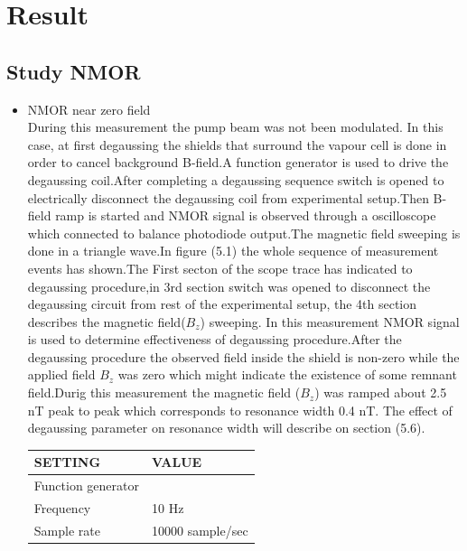 \chapter{Result\label{ch:results}}


\section{Study NMOR }
   \begin{itemize}
     \item NMOR near zero field \\
 During this measurement the pump beam was not been modulated. In this case,  at first degaussing the shields that surround the vapour cell is done in order to cancel background B-field.A function generator is used to drive the degaussing coil.After completing a degaussing sequence switch is opened to electrically disconnect the degaussing coil from experimental setup.Then B-field ramp is started and NMOR signal is observed through a oscilloscope which  connected to balance photodiode output.The magnetic field sweeping is done in a triangle wave.In figure (5.1) the whole sequence of measurement events has shown.The First secton of the scope trace has indicated to degaussing procedure,in 3rd section  switch was opened to disconnect the degaussing circuit from rest of the experimental setup, the 4th section describes the magnetic field($B_z$) sweeping. 
In this measurement NMOR signal is used to determine effectiveness of degaussing procedure.After the degaussing procedure the observed field inside the shield is non-zero while the applied field $B_z$ was zero which might indicate the existence of some remnant field.Durig this measurement the magnetic field ($B_z$) was ramped about 2.5 nT peak to peak which corresponds to resonance width 0.4 nT. The effect of degaussing parameter on resonance width will describe on section (5.6).
\begin{table}[h]
\centering
\begin{tabular}{|l |l|}
\hline

\textbf{ SETTING}    & \textbf{VALUE} \\
\hline
Function generator &   \\
\hline
Frequency & 10 Hz   \\

Sample rate    &  10000 sample/sec  \\


\end{tabular}
\end{table}
\end{itemize}
